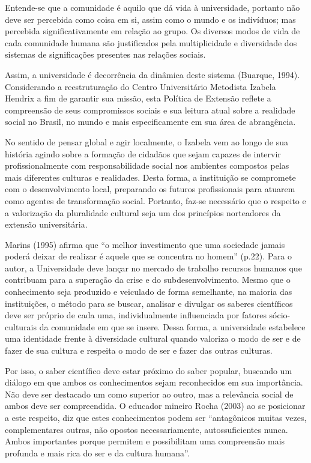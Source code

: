 \documentclass[a4paper, 12pt, openright, oneside, german, french, english, brazil]{abntex2}
\begin{document}
Entende-se que a comunidade é aquilo que dá vida à universidade, portanto não deve ser percebida como coisa em si, assim como o mundo e os indivíduos; mas percebida significativamente em relação ao grupo. Os diversos modos de vida de cada comunidade humana são justificados pela multiplicidade e diversidade dos sistemas de significações presentes nas relações sociais.

Assim, a universidade é decorrência da dinâmica deste sistema (Buarque, 1994). Considerando a reestruturação do Centro Universitário Metodista Izabela Hendrix a fim de garantir sua missão, esta Política de Extensão reflete a compreensão de seus compromissos sociais e sua leitura atual sobre a realidade social no Brasil, no mundo e mais especificamente em sua área de abrangência.

No sentido de pensar global e agir localmente, o Izabela vem ao longo de sua história agindo sobre a formação de cidadãos que sejam capazes de intervir profissionalmente com responsabilidade social nos ambientes compostos pelas mais diferentes culturas e realidades. Desta forma, a instituição se compromete com o desenvolvimento local, preparando os futuros profissionais para atuarem como agentes de transformação social. Portanto, faz-se necessário que o respeito e a valorização da pluralidade cultural seja um dos princípios norteadores da extensão universitária.

Marins (1995) afirma que “o melhor investimento que uma sociedade jamais poderá deixar de realizar é aquele que se concentra no homem” (p.22). Para o autor, a Universidade deve lançar no mercado de trabalho recursos humanos que contribuam para a superação da crise e do subdesenvolvimento. Mesmo que o conhecimento seja produzido e veiculado de forma semelhante, na maioria das instituições, o método para se buscar, analisar e divulgar os saberes científicos deve ser próprio de cada uma, individualmente influenciada por fatores sócio-culturais da comunidade em que se insere. Dessa forma, a universidade estabelece uma identidade frente à diversidade cultural quando valoriza o modo de ser e de fazer de sua cultura e respeita o modo de ser e fazer das outras culturas.

Por isso, o saber científico deve estar próximo do saber popular, buscando um diálogo em que ambos os conhecimentos sejam reconhecidos em sua importância. Não deve ser destacado um como superior ao outro, mas a relevância social de ambos deve ser compreendida. O educador mineiro Rocha (2003) ao se posicionar a este respeito, diz que estes conhecimentos podem ser “antagônicos muitas vezes, complementares outras, não opostos necessariamente, autossuficientes nunca. Ambos importantes porque permitem e possibilitam uma compreensão mais profunda e mais rica do ser e da cultura humana”.
\end{document}
